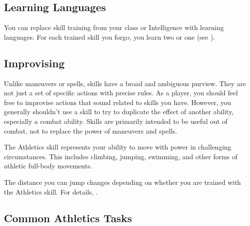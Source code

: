   \subsection{Learning Languages}
    You can replace skill training from your class or Intelligence with learning languages.
    For each trained skill you forgo, you learn two  or one  (see ).

  \subsection{Improvising}
    Unlike maneuvers or spells, skills have a broad and ambiguous purview.
    They are not just a set of specific actions with precise rules.
    As a player, you should feel free to improvise actions that sound related to skills you have.
    However, you generally shouldn't use a skill to try to duplicate the effect of another ability, especially a combat ability.
    Skills are primarily intended to be useful out of combat, not to replace the power of maneuvers and spells.

\newpage
{}
  The Athletics skill represents your ability to move with power in challenging circumstances.
  This includes climbing, jumping, swimming, and other forms of athletic full-body movements. 

  The distance you can jump changes depending on whether you are trained with the Athletics skill.
  For details, .

  \subsection{Common Athletics Tasks}


